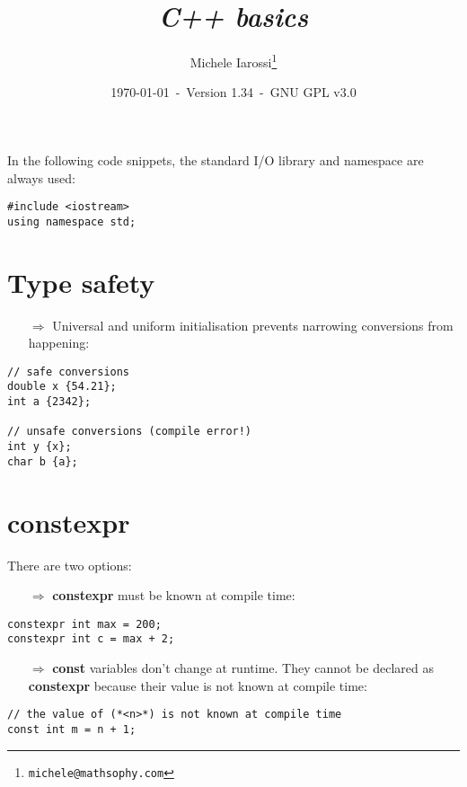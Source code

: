 \documentclass[10pt]{article}
\begin{document}
\title{\emph{C++ basics}}
\author{Michele Iarossi\thanks{\texttt{michele@mathsophy.com}}}
\date{\small \today~-~Version 1.34~-~GNU GPL v3.0}


\maketitle

\small

\begin{frame}{}
\setlength\columnsep{1cm}
\begin{multicols}{2}
\tableofcontents
\end{multicols}
\end{frame}

\noindent
In the following code snippets, the standard I/O library and namespace are always used:
\begin{lstlisting}
#include <iostream>
using namespace std;
\end{lstlisting}

\newpage
%
%
\section{Type safety}
\small
\begin{enumerate}
\item[$\Rightarrow$] Universal and uniform initialisation prevents narrowing conversions from happening:
\end{enumerate}
\begin{lstlisting}
// safe conversions
double x {54.21};
int a {2342};

// unsafe conversions (compile error!)
int y {x};
char b {a};
\end{lstlisting}
%
%
\section{constexpr}
\small
There are two options:
\begin{enumerate}
\item[$\Rightarrow$] \textbf{constexpr} must be known at compile time:
\end{enumerate}
\begin{lstlisting}
constexpr int max = 200;
constexpr int c = max + 2;
\end{lstlisting}
\begin{enumerate}
\item[$\Rightarrow$] \textbf{const} variables don't change at runtime. They cannot be declared as
\textbf{constexpr} because their value is not known at compile time:
\end{enumerate}
\begin{lstlisting}
// the value of (*<n>*) is not known at compile time
const int m = n + 1;
\end{lstlisting}
%
%
\end{document}
